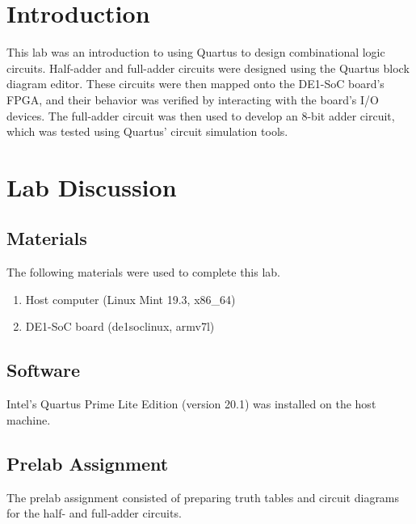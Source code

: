\documentclass[11pt, letterpaper]{article} %
\begin{document}
\makelabtitle

\section*{Introduction}

This lab was an introduction to using Quartus to design combinational logic circuits. Half-adder and full-adder circuits were designed using the Quartus block diagram editor. These circuits were then mapped onto the DE1-SoC board's FPGA, and their behavior was verified by interacting with the board's I/O devices. The full-adder circuit was then used to develop an 8-bit adder circuit, which was tested using Quartus' circuit simulation tools. 

\section*{Lab Discussion}

\subsection*{Materials}

The following materials were used to complete this lab.
\begin{enumerate}
    \item Host computer (Linux Mint 19.3, x86\_64)
    \item DE1-SoC board (de1soclinux, armv7l)
\end{enumerate}
\subsection*{Software}
Intel's Quartus Prime Lite Edition (version 20.1) was installed on the host machine.

\subsection*{Prelab Assignment}

The prelab assignment consisted of preparing truth tables and circuit diagrams for the half- and full-adder circuits.
\end{document}
